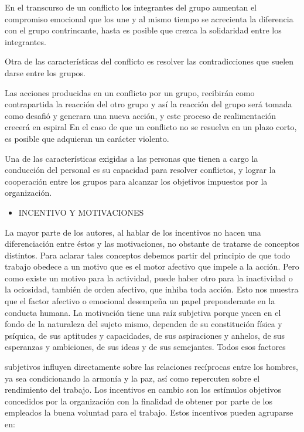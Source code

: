 En el transcurso de un conflicto los integrantes del grupo aumentan el compromiso emocional que los une y al mismo tiempo se acrecienta la diferencia con el grupo contrincante, hasta es posible que crezca la solidaridad entre los integrantes.

Otra de las características del conflicto es resolver las contradicciones que suelen darse entre los grupos.

Las acciones producidas en un conflicto por un grupo, recibirán como contrapartida la reacción del otro grupo y así la reacción del grupo será tomada como desafió y generara una nueva acción, y este proceso de realimentación crecerá en espiral En el caso de que un conflicto no se resuelva en un plazo corto, es posible que adquieran un carácter violento.

Una de las características exigidas a las personas que tienen a cargo la conducción del personal es su capacidad para resolver conflictos, y lograr la cooperación entre los grupos para alcanzar los objetivos impuestos por la organización.

\begin{itemize}
  \item INCENTIVO Y MOTIVACIONES
\end{itemize}
La mayor parte de los autores, al hablar de los incentivos no hacen una diferenciación entre éstos y las motivaciones, no obstante de tratarse de conceptos distintos. Para aclarar tales conceptos debemos partir del principio de que todo trabajo obedece a un motivo que es el motor afectivo que impele a la acción. Pero como existe un motivo para la actividad, puede haber otro para la inactividad o la ociosidad, también de orden afectivo, que inhiba toda acción. Esto nos muestra que el factor afectivo o emocional desempeña un papel preponderante en la conducta humana. La motivación tiene una raíz subjetiva porque yacen en el fondo de la naturaleza del sujeto mismo, dependen de su constitución física y psíquica, de sus aptitudes y capacidades, de sus aspiraciones y anhelos, de sus esperanzas y ambiciones, de sus ideas y de sus semejantes. Todos esos factores



subjetivos influyen directamente sobre las relaciones recíprocas entre los hombres, ya sea condicionando la armonía y la paz, así como repercuten sobre el rendimiento del trabajo. Los incentivos en cambio son los estímulos objetivos concedidos por la organización con la finalidad de obtener por parte de los empleados la buena voluntad para el trabajo. Estos incentivos pueden agruparse en:

